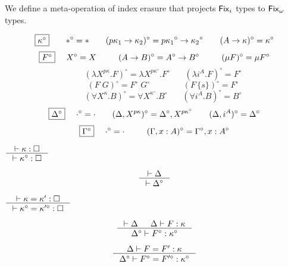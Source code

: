 We define a meta-operation of index erasure that projects $\Fixi$ types
to $\Fixw$ types.
\begin{definition}\label{def:Fixierase}
\[ \fbox{$\kappa^\circ$}
 ~~~~ ~~
 *^\circ =
 *
 ~~~~ ~~
 (p\kappa_1 -> \kappa_2)^\circ =
 p{\kappa_1}^\circ -> {\kappa_2}^\circ
 ~~~~ ~~
 (A -> \kappa)^\circ =
 \kappa^\circ
\]
\[ \fbox{$F^\circ$}
 ~~~~
 X^\circ =
 X
 ~~~~ ~~~~
 (A -> B)^\circ =
 A^\circ -> B^\circ
 ~~~~ ~~~~
 (\mu F)^\circ =
 \mu F^\circ
\]
\[ \qquad
 (\lambda X^{p\kappa}.F)^\circ =
 \lambda X^{p\kappa^\circ}.F^\circ
 ~~~~ ~~~~
 (\lambda i^A.F)^\circ =
 F^\circ
\]
\[ \qquad
 (F\;G)^\circ =
 F^\circ\;G^\circ
 ~~~~ ~~~~ ~~~~ ~~~~ ~~
 (F\,\{s\})^\circ =
 F^\circ
\]
\[ \qquad
 (\forall X^\kappa . B)^\circ =
 \forall X^{\kappa^\circ} . B^\circ
 ~~~~ ~~~~
 (\forall i^A . B)^\circ =
 B^\circ
\]
\[ \fbox{$\Delta^\circ$}
 ~~~~
 \cdot^\circ = \cdot
 ~~~~ ~~
 (\Delta,X^{p\kappa})^\circ = \Delta^\circ,X^{p\kappa^\circ}
 ~~~~ ~~
 (\Delta,i^A)^\circ = \Delta^\circ
\]
\[ \fbox{$\Gamma^\circ$}
 ~~~~
 \cdot^\circ = \cdot
 ~~~~ ~~~~
 (\Gamma,x:A)^\circ = \Gamma^\circ,x:A^\circ
\]
\end{definition}

\begin{theorem}
\label{thm:Fixierasesorting}
	$\inference{|- \kappa : \square}{|- \kappa^\circ : \square}$
\end{theorem}

\begin{theorem}
\label{thm:Fixierasetyctx}
\[ \inference{|- \Delta}{|- \Delta^\circ} \]
\end{theorem}

\begin{theorem}\label{thm:Fixierasekindeq}
$ \inference{|- \kappa=\kappa':\square}
	{|- \kappa^\circ=\kappa'^\circ:\square}
$
\end{theorem}

\begin{theorem}
\label{thm:Fixierasekinding}
\[ \inference{|- \Delta & \Delta |- F : \kappa}
		{\Delta^\circ |- F^\circ : \kappa^\circ}
\]
\end{theorem}
\begin{theorem}
\[ \inference{\Delta |- F=F':\kappa}
		{\Delta^\circ |- F^\circ=F'^\circ:\kappa^\circ}
\]
\label{thm:Fixierasetyconeq}
\end{theorem}

